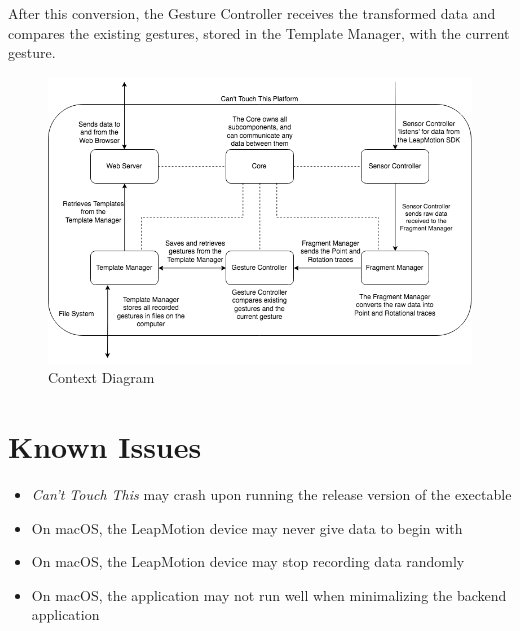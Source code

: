 \documentclass[a4paper]{article}
\providecommand{\tightlist}{%
\setlength{\itemsep}{0pt}\setlength{\parskip}{0pt}}
\begin{document}
  After this conversion, the Gesture Controller receives the transformed data
  and compares the existing gestures, stored in the Template Manager, with the
  current gesture.
  \clearpage

  \begin{figure}[h]
    \caption{Context Diagram}
    \centering
    \includegraphics[width=\linewidth]{functional-diagram}
  \end{figure}
  \clearpage



  \section{Known Issues}
  \begin{itemize}
    \tightlist
    \item \textit{Can't Touch This} may crash upon running the release version
      of the exectable
    \item On macOS, the LeapMotion device may never give data to begin with
    \item On macOS, the LeapMotion device may stop recording data randomly
    \item On macOS, the application may not run well when minimalizing the
      backend application
  \end{itemize}
\end{document}
